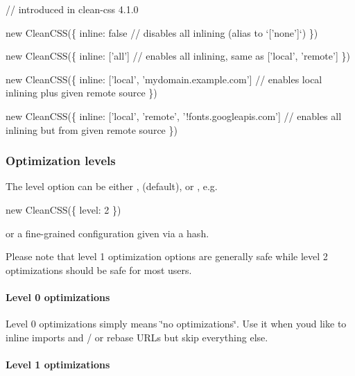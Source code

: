 \begin{DoxyCode}
// introduced in clean-css 4.1.0

new CleanCSS(\{
  inline: false // disables all inlining (alias to `['none']`)
\})
\end{DoxyCode}



\begin{DoxyCode}
new CleanCSS(\{
  inline: ['all'] // enables all inlining, same as ['local', 'remote']
\})
\end{DoxyCode}



\begin{DoxyCode}
new CleanCSS(\{
  inline: ['local', 'mydomain.example.com'] // enables local inlining plus given remote source
\})
\end{DoxyCode}



\begin{DoxyCode}
new CleanCSS(\{
  inline: ['local', 'remote', '!fonts.googleapis.com'] // enables all inlining but from given remote source
\})
\end{DoxyCode}


\subsubsection*{Optimization levels}

The {\ttfamily level} option can be either {}, {} (default), or {}, e.\+g.


\begin{DoxyCode}
new CleanCSS(\{
  level: 2
\})
\end{DoxyCode}


or a fine-\/grained configuration given via a hash.

Please note that level 1 optimization options are generally safe while level 2 optimizations should be safe for most users.

\paragraph*{Level 0 optimizations}

Level 0 optimizations simply means \char`\"{}no optimizations\char`\"{}. Use it when you\textquotesingle{}d like to inline imports and / or rebase U\+R\+Ls but skip everything else.

\paragraph*{Level 1 optimizations}


